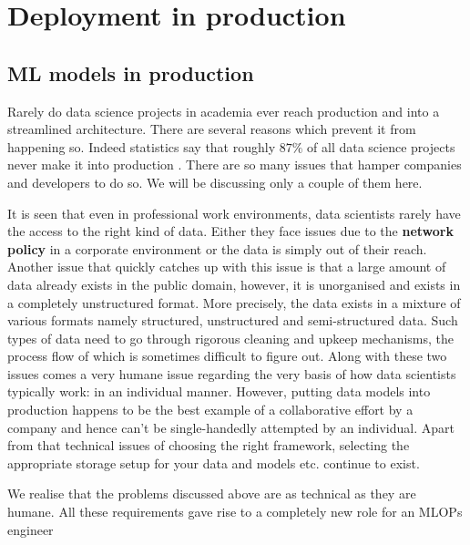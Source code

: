 \chapter{Deployment in production} \label{chapter4}

\section{ML models in production}


Rarely do data science projects in academia ever reach production and into a streamlined architecture. There are several reasons which prevent it from happening so. Indeed statistics say that roughly $87\%$ of all data science projects never make it into production \cite{vb2019}.  There are so many issues that hamper companies and developers to do so. We will be discussing only a couple of them here. \par

It is seen that even in professional work environments, data scientists rarely have the access to the right kind of data. Either they face issues due to the \textbf{network policy} in a corporate environment or the data is simply out of their reach. Another issue that quickly catches up with this issue is that a large amount of data already exists in the public domain, however, it is unorganised and exists in a completely unstructured format. More precisely, the data exists in a mixture of various formats namely structured, unstructured and semi-structured data. Such types of data need to go through rigorous cleaning and upkeep mechanisms, the process flow of which is sometimes difficult to figure out. Along with these two issues comes a very humane issue regarding the very basis of how data scientists typically work: in an individual manner. However, putting data models into production happens to be the best example of a collaborative effort by a company and hence can’t be single-handedly attempted by an individual. Apart from that technical issues of choosing the right framework, selecting the appropriate storage setup for your data and models etc. continue to exist.\par

We realise that the problems discussed above are as technical as they are humane. All these requirements gave rise to a completely new role for an MLOPs engineer \cite{Odegua2020}

